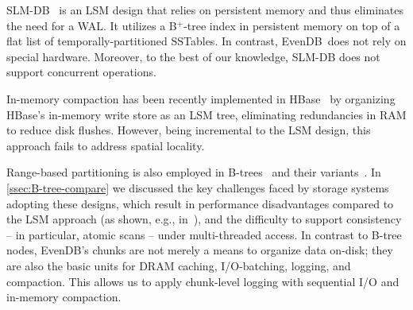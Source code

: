 \documentclass[sigplan,10pt]{acmart}
\newcommand{\remove}[1]{}
\newcommand{\sys}{EvenDB}
\begin{document}
\remove{
A number of systems focus on reducing write amplification.
PebblesDB~\cite{PebblesDB} introduces fragmented LSM trees in which level files are 
sliced into {\em guards\/} of increasing granularity and organized in a skiplist-like layout. 
In contrast, \sys\/ eliminates the concept of levels altogether, 
and employs a flat  layout. WiscKey~\cite{WiscKey} separates key and value storage 
in SSTables, also in order to reduce amplification. This optimization is orthogonal to \sys's concepts,
and could benefit our work as well. 
%
VT-Trees~\cite{vttrees} apply stitching to avoid rewriting already sorted data. This improves performance and significantly reduces write amplification in some scenarios (e.g., time-series ingestion).
}

SLM-DB~\cite{slmdb} is an LSM design that relies on persistent memory and thus eliminates the need for a WAL. It  
utilizes a B$^+$-tree index in persistent memory on top of a flat list of temporally-partitioned SSTables. 
In contrast, \sys\ does not rely on special hardware. 
Moreover, to the best of our knowledge, SLM-DB does not support concurrent operations.

In-memory compaction has been recently implemented in HBase~\cite{accordion} by organizing
HBase's in-memory write store  as an LSM tree, eliminating redundancies 
in RAM to reduce disk flushes. However, being incremental to the LSM design, 
this approach fails to address spatial locality. 

Range-based  partitioning is also employed in  B-trees~\cite{Knuth:1998:ACP:280635} and their variants~\cite{Brodal:2003:LBE:644108.644201}. In
 \cref{ssec:B-tree-compare} we discussed the key challenges faced by storage systems adopting these designs, which 
 result in performance disadvantages compared to the LSM approach  (as shown, e.g., in~\cite{toku-rocks-inno}), 
 and the difficulty to support consistency  -- in particular, atomic scans --   under multi-threaded access.
 In contrast to B-tree nodes, \sys's chunks are not merely  a means to organize data on-disk; they 
are also the basic units for DRAM caching, I/O-batching, logging, and compaction. 
This allows us to apply chunk-level logging with sequential I/O and in-memory compaction.

 \remove{
 , which suffer from a write bottleneck in random updates to 
leaf blocks. \sys\/ overcomes this limitation through (1) transforming random I/O to sequential I/O at the chunk level, 
(2) managing a write-through chunk cache in memory (munks), and (3) reducing I/O  through in-memory (munk) compaction. 

A $B^{\epsilon}$-tree~\cite{Brodal:2003:LBE:644108.644201} is a B-tree variant that uses overflow write buffers in internal nodes. 
This design speeds up writes and reduces write amplification, however lookups are slowed down by having to search in unordered 
buffers. $B^{\epsilon}$-trees have been used in KV-stores (TokuDB~\cite{TokuDB}) and filesystems (BetrFS~\cite{BetrFS}).  
}
\end{document}
